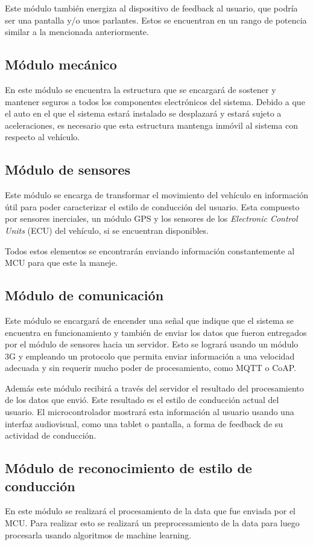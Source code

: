 Este módulo también energiza al dispositivo de feedback al usuario, que podría ser una pantalla y/o unos parlantes. Estos se encuentran en un rango de potencia similar a la mencionada anteriormente.

\subsection{Módulo mecánico}
En este módulo se encuentra la estructura que se encargará de sostener y mantener seguros a todos los componentes electrónicos del sistema. Debido a que el auto en el que el sistema estará instalado se desplazará y estará sujeto a aceleraciones, es necesario que esta estructura mantenga inmóvil al sistema con respecto al vehículo.

\subsection{Módulo de sensores}

Este módulo se encarga de transformar el movimiento del vehículo en información útil para poder caracterizar el estilo de conducción del usuario. Esta compuesto por sensores inerciales, un módulo GPS y los sensores de los {\it Electronic Control Units} (ECU) del vehículo, si se encuentran disponibles.

Todos estos elementos se encontrarán enviando información constantemente al MCU para que este la maneje.

\subsection{Módulo de comunicación}
Este módulo se encargará de encender una señal que indique que el sistema se encuentra en funcionamiento y también de enviar los datos que fueron entregados por el módulo de sensores hacia un servidor. Esto se logrará usando un módulo 3G y empleando un protocolo que permita enviar información a una velocidad adecuada y sin requerir mucho poder de procesamiento, como MQTT o CoAP.

Además este módulo recibirá a través del servidor el resultado del procesamiento de los datos que envió. Este resultado es el estilo de conducción actual del usuario. El microcontrolador mostrará esta información al usuario usando una interfaz audiovisual, como una tablet o pantalla, a forma de feedback de su actividad de conducción.

\subsection{Módulo de reconocimiento de estilo de conducción}
En este módulo se realizará el procesamiento de la data que fue enviada por el MCU. Para realizar esto se realizará un preprocesamiento de la data para luego procesarla usando algoritmos de machine learning.


